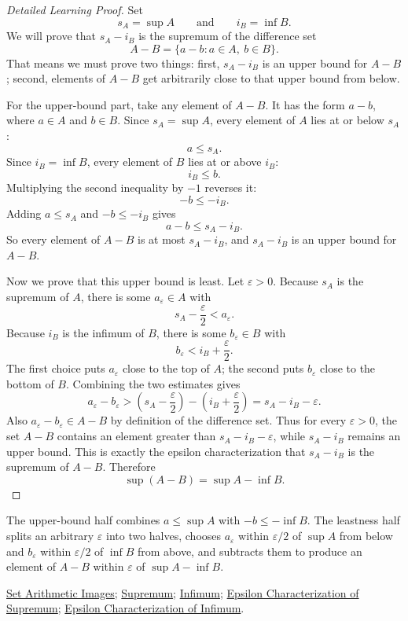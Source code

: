 \begin{proof}[Detailed Learning Proof]
\LRAProofBodyStart
Set
\[
  s_A=\sup A
  \qquad\text{and}\qquad
  i_B=\inf B.
\]
We will prove that $s_A-i_B$ is the supremum of the difference set
\[
  A-B=\{a-b:a\in A,\ b\in B\}.
\]
That means we must prove two things: first, $s_A-i_B$ is an upper bound for
$A-B$; second, elements of $A-B$ get arbitrarily close to that upper bound from
below.

For the upper-bound part, take any element of $A-B$. It has the form $a-b$,
where $a\in A$ and $b\in B$. Since $s_A=\sup A$, every element of $A$ lies at
or below $s_A$:
\[
  a\le s_A.
\]
Since $i_B=\inf B$, every element of $B$ lies at or above $i_B$:
\[
  i_B\le b.
\]
Multiplying the second inequality by $-1$ reverses it:
\[
  -b\le -i_B.
\]
Adding $a\le s_A$ and $-b\le -i_B$ gives
\[
  a-b\le s_A-i_B.
\]
So every element of $A-B$ is at most $s_A-i_B$, and $s_A-i_B$ is an upper bound
for $A-B$.

Now we prove that this upper bound is least. Let $\varepsilon>0$. Because
$s_A$ is the supremum of $A$, there is some $a_\varepsilon\in A$ with
\[
  s_A-\frac{\varepsilon}{2}<a_\varepsilon.
\]
Because $i_B$ is the infimum of $B$, there is some $b_\varepsilon\in B$ with
\[
  b_\varepsilon<i_B+\frac{\varepsilon}{2}.
\]
The first choice puts $a_\varepsilon$ close to the top of $A$; the second puts
$b_\varepsilon$ close to the bottom of $B$. Combining the two estimates gives
\[
  a_\varepsilon-b_\varepsilon
  >
  \left(s_A-\frac{\varepsilon}{2}\right)
  -
  \left(i_B+\frac{\varepsilon}{2}\right)
  =
  s_A-i_B-\varepsilon.
\]
Also $a_\varepsilon-b_\varepsilon\in A-B$ by definition of the difference set.
Thus for every $\varepsilon>0$, the set $A-B$ contains an element greater than
$s_A-i_B-\varepsilon$, while $s_A-i_B$ remains an upper bound. This is exactly
the epsilon characterization that $s_A-i_B$ is the supremum of $A-B$.
Therefore
\[
  \sup(A-B)=\sup A-\inf B.
\]
\end{proof}

\begin{remark*}
The upper-bound half combines $a\le\sup A$ with $-b\le-\inf B$. The leastness
half splits an arbitrary $\varepsilon$ into two halves, chooses
$a_\varepsilon$ within $\varepsilon/2$ of $\sup A$ from below and
$b_\varepsilon$ within $\varepsilon/2$ of $\inf B$ from above, and subtracts
them to produce an element of $A-B$ within $\varepsilon$ of
$\sup A-\inf B$.
\end{remark*}

\begin{dependencies}
\hyperref[def:set-arithmetic-images]{Set Arithmetic Images};
\hyperref[def:supremum]{Supremum};
\hyperref[def:infimum]{Infimum};
\hyperref[def:epsilon-characterization-of-supremum]{Epsilon Characterization of Supremum};
\hyperref[def:epsilon-characterization-of-infimum]{Epsilon Characterization of Infimum}.
\end{dependencies}

\clearpage
